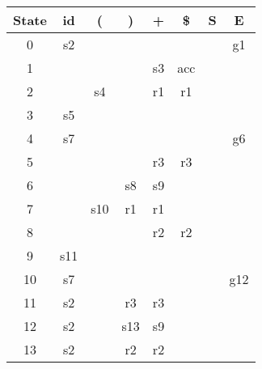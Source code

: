 \begin{center}
    \begin{latin}
    \begin{tabular}{|c|c|c|c|c|c|c|c|}
    \hline
    State & id & ( & ) & + & \$ & S & E \\ \hline
    0     & s2 &   &   &   &    &   & g1\\ \hline
    1     &    &   &   & s3& acc&   &   \\ \hline
    2     &    & s4&   & r1& r1 &   &   \\ \hline
    3     & s5 &   &   &   &    &   &   \\ \hline
    4     & s7 &   &   &   &    &   & g6\\ \hline
    5     &    &   &   & r3& r3 &   &   \\ \hline
    6     &    &   & s8& s9&    &   &   \\ \hline
    7     &    &s10& r1& r1&    &   &   \\ \hline
    8     &    &   &   & r2& r2 &   &   \\ \hline
    9     & s11&   &   &   &    &   &   \\ \hline
    10    & s7 &   &   &   &    &   &g12\\ \hline
    11    & s2 &   & r3& r3&    &   &   \\ \hline
    12    & s2 &   &s13& s9&    &   &   \\ \hline
    13    & s2 &   & r2& r2&    &   &   \\ \hline
    \end{tabular}
    \end{latin}
\end{center}